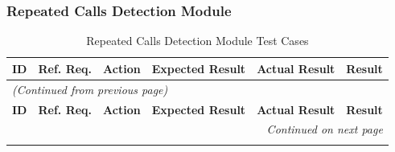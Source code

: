 \documentclass[12pt, titlepage]{article}
\begin{document}
\subsubsection{Repeated Calls Detection Module}

\begin{longtable}{c
    >{\raggedright\arraybackslash}p{1.5cm}
    >{\raggedright\arraybackslash}p{4.5cm}
    >{\raggedright\arraybackslash}p{4cm}
  >{\raggedright\arraybackslash}p{3cm} c}
  \toprule
  \textbf{ID} & \textbf{Ref. Req.} & \textbf{Action} &
  \textbf{Expected Result} & \textbf{Actual Result} & \textbf{Result} \\
  \midrule
  \endfirsthead

  \multicolumn{6}{l}{\textit{(Continued from previous page)}} \\
  \toprule
  \textbf{ID} & \textbf{Ref. Req.} & \textbf{Action} &
  \textbf{Expected Result} & \textbf{Actual Result} & \textbf{Result} \\
  \midrule
  \endhead

  \multicolumn{6}{r}{\textit{Continued on next page}} \\
  \endfoot

  \bottomrule
  \caption{Repeated Calls Detection Module Test Cases}
  \label{table:crc_tests}
  \endlastfoot


\end{longtable}
\end{document}
